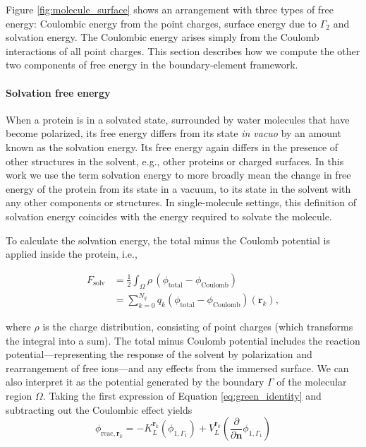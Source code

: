 
Figure \ref{fig:molecule_surface} shows an arrangement with three types of free energy: Coulombic energy from the point charges, surface energy due to $\Gamma_2$ and solvation energy. The Coulombic energy arises simply from the Coulomb interactions of all point charges. This section describes how we compute the other two components of free energy in the boundary-element framework.

\medskip

\paragraph*{Solvation free energy}

When a protein is in a solvated state, surrounded by water molecules that have become polarized, its free energy differs from its state \emph{in vacuo} by an amount known as the solvation energy. Its free energy again differs in the presence of other structures in the solvent, e.g., other proteins or charged surfaces. In this work we use the term solvation energy to more broadly mean the change in free energy of the protein from its state in a vacuum, to its state in the solvent with any other components or structures. In single-molecule settings, this definition of solvation energy coincides with the energy required to solvate the molecule. 

To calculate the solvation energy, the total minus the Coulomb potential is applied inside the protein, i.e.,

\begin{align} \label{eq:solv_energy}
F_{\text{solv}} &= \frac{1}{2} \int_{\Omega} \rho \,(\phi_{\text{total}} - \phi_{\text{Coulomb}}) \\
&= \sum_{k=0}^{N_q} q_k (\phi_{\text{total}} - \phi_{\text{Coulomb}})(\mathbf{r}_k),
\end{align}

\noindent where $\rho$ is the charge distribution, consisting of point charges (which transforms the integral into a sum). 
The total minus Coulomb potential includes the reaction potential---representing the response of the solvent by polarization and rearrangement of free ions---and any effects from the immersed surface.
We can also interpret it as the potential generated by the boundary $\Gamma$ of the molecular region $\Omega$. Taking the first expression of Equation \eqref{eq:green_identity} and subtracting out the Coulombic effect yields
%
\begin{equation} \label{eq:phi_reac_bem}
\phi_{\text{reac},\mathbf{r}_k} = -K_{L}^{\mathbf{r}_k}(\phi_{1,\Gamma_1}) + V_{L}^{\mathbf{r}_k} \left(\frac{\partial}{\partial \mathbf{n}}\phi_{1,\Gamma_1} \right) 
\end{equation}

